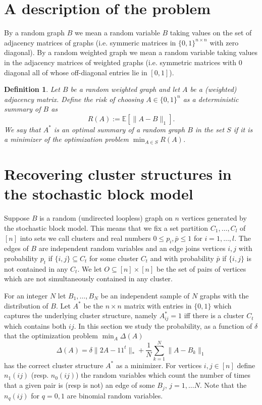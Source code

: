 \documentclass[12pt]{amsart}
\newtheorem{definition}[lemma]{Definition}
\theoremstyle{remark}
\newcommand{\EE}{\mathbb{E}}
\begin{document}
\section{A description of the problem}

By a random graph $B$ we mean a random variable $B$ taking values on the set of adjacency matrices of graphs (i.e. symmeric matrices in $\{0,1\}^{n\times n}$ with zero diagonal). By a random weighted graph we mean a random variable taking values in the adjacency matrices of weighted graphs (i.e. symmetric matrices with $0$ diagonal all of whose off-diagonal entries lie in $[0,1]$). 

\begin{definition} Let $B$ be a random weighted graph and let $A$ be a (weighted) adjacency matrix. Define the risk of choosing $A\in \{0,1\}^n$ as a deterministic summary of $B$ as
\[R(A):=\EE[\|A-B\|_1].\]
We say that $A^*$ is an optimal summary of a random graph $B$ in the set $S$ if it is a minimizer of the optimization problem $\min_{A\in S} R(A)$.
\end{definition}


\section{Recovering cluster structures in the stochastic block model}

Suppose $B$ is a random (undirected loopless) graph on $n$ vertices generated by the stochastic block model. This means that we fix a set partition $C_1,\dots, C_l$ of $[n]$ into sets we call clusters and real numbers $0\leq p_i,\bar{p}\leq 1$ for $i=1,\dots, l$. The edges of $B$ are independent random variables and an edge joins vertices $i,j$ with probability $p_t$ if $\{i,j\}\subseteq C_t$ for some cluster $C_t$ and with probability $\bar{p}$ if $\{i,j\}$ is not contained in any $C_t$. We let $O\subseteq [n]\times [n]$ be the set of pairs of vertices which are not simultaneously contained in any cluster. 

For an integer $N$ let $B_1,\dots, B_N$ be an independent sample of $N$ graphs with the distribution of $B$. Let $A^*$ be the $n\times n$ matrix with entries in $\{0,1\}$ which captures the underlying cluster structure, namely $A^*_{ij}=1$ iff there is a cluster $C_t$ which contains both $ij$. In this section we study the probability, as a function of $\delta$ that the optimization problem $\min_A\Delta(A)$
\[\Delta(A)= \delta\|2A-11^t\|_{*}+\frac{1}{N}\sum_{k=1}^N\|A-B_k\|_1\] 
has the correct cluster structure $A^*$ as a minimizer. For vertices $i,j\in [n]$ define $n_1(ij)$ (resp. $n_0(ij)$) the random variables which count the number of times that a given pair is (resp is not) an edge of some $B_j$, $j=1,\dots N$. Note that the $n_q(ij)$ for $q=0,1$ are binomial random variables.  
\end{document}

